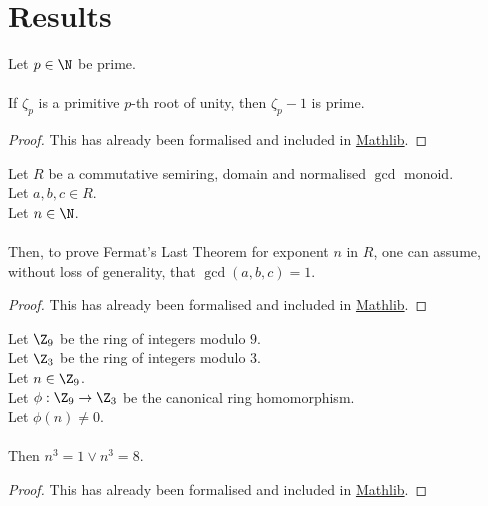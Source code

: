 \section{Results}

\begin{theorem}
    \label{thm:zeta_sub_one_prime1}
    \leanok
    Let $p \in \N$ be prime. \\\\
    If $\zeta_p$ is a primitive $p$-th root of unity, then $\zeta_p - 1$ is prime.
\end{theorem}
\begin{proof}
    \leanok
    This has already been formalised and included in \href{https://pitmonticone.github.io/FLT3/docs/FLT3/Mathlib/NumberTheory/Cyclotomic/Rat.html#IsPrimitiveRoot.zeta_sub_one_prime'}{Mathlib}.
\end{proof}

\begin{lemma}
    \label{lmm:fermatLastTheoremWith_of_fermatLastTheoremWith_coprime}
    \leanok
    Let $R$ be a commutative semiring, domain and normalised $\gcd$ monoid.\\%
    Let $a, b, c \in R$. \\
    Let $n \in \N$. \\\\
    Then, to prove Fermat's Last Theorem for exponent $n$ in $R$,
    one can assume, without loss of generality, that $\gcd(a,b,c)=1$.
  \end{lemma}
  \begin{proof}
    \leanok
    This has already been formalised and included in \href{https://pitmonticone.github.io/FLT3/docs/FLT3/Mathlib/NumberTheory/FLT/Basic.html#fermatLastTheoremWith_of_fermatLastTheoremWith_coprime}{Mathlib}.
  \end{proof}

  \begin{lemma}
    \label{lmm:cube_of_castHom_ne_zero}
    \leanok
    Let $\Z_9$ be the ring of integers modulo $9$. \\
    Let $\Z_3$ be the ring of integers modulo $3$. \\
    Let $n \in \Z_9$. \\
    Let $\phi : \Z_9 \to \Z_3$ be the canonical ring homomorphism. \\
    Let $\phi(n) \neq 0$. \\ \\
    Then $n^3=1 \lor n^3=8$.
  \end{lemma}
  \begin{proof}
    \leanok
    This has already been formalised and included in \href{https://pitmonticone.github.io/FLT3/docs/FLT3/Mathlib/NumberTheory/FLT/Three.html#cube_of_castHom_ne_zero}{Mathlib}.
  \end{proof}